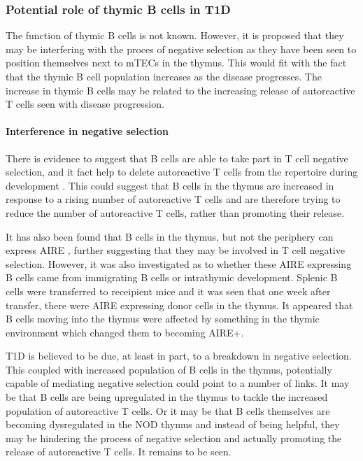 \subsubsection{Potential role of thymic B cells in T1D}

The function of thymic B cells is not known.
However, it is proposed that they may be interfering with the proces of negative selection as they have been seen to position themselves next to mTECs in the thymus.
This would fit with the fact that the thymic B cell population increases as the disease progresses.
The increase in thymic B cells may be related to the increasing release of autoreactive T cells seen with disease progression.

\paragraph{Interference in negative selection}

There is evidence to suggest that B cells are able to take part in T cell negative selection, and it fact help to delete autoreactive T cells from the repertoire during development \citep{Frommer2010}.
This could suggest that B cells in the thymus are increased in response to a rising number of autoreactive T cells and are therefore trying to reduce the number of autoreactive T cells, rather than promoting their release.

It has also been found that B cells in the thymus, but not the periphery can express AIRE \citep{Yamano2015}, further suggesting that they may be involved in T cell negative selection.
However, it was also investigated as to whether these AIRE expressing B cells came from immigrating B cells or intrathymic development.
Splenic B cells were transferred to receipient mice and it was seen that one week after transfer, there were AIRE expressing donor cells in the thymus.
It appeared that B cells moving into the thymus were affected by something in the thymic environment which changed them to becoming AIRE+.

T1D is believed to be due, at least in part, to a breakdown in negative selection.
This coupled with increased population of B cells in the thymus, potentially capable of mediating negative selection could point to a number of links.
It may be that B cells are being upregulated in the thymus to tackle the increased population of autoreactive T cells.
Or it may be that B cells themselves are becoming dysregulated in the NOD thymus and instead of being helpful, they may be hindering the process of negative selection and actually promoting the release of autoreactive T cells.
It remains to be seen.









